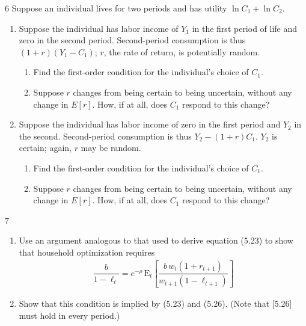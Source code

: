 \begin{problem}{6}
Suppose an individual lives for two periods and has utility \(\ln C_1+\ln C_2\).
\begin{enumerate}[label=(\alph*)]
    \item Suppose the individual has labor income of \(Y_1\) in the first period of life and zero in the second period. Second-period consumption is thus \(\left(1+r\right)\left(Y_1-C_1\right)\); \(r\), the rate of return, is potentially random.
    \begin{enumerate}[label=(\roman*)]
        \item Find the first-order condition for the individual's choice of \(C_1\).
        \item Suppose \(r\) changes from being certain to being uncertain, without any change in \(E\left[r\right]\). How, if at all, does \(C_1\) respond to this change?
    \end{enumerate}
    \item Suppose the individual has labor income of zero in the first period and \(Y_2\) in the second. Second-period consumption is thus \(Y_2-\left(1+r\right)C_1\). \(Y_2\) is certain; again, \(r\) may be random.
    \begin{enumerate}[label=(\roman*)]
        \item Find the first-order condition for the individual's choice of \(C_1\).
        \item Suppose \(r\) changes from being certain to being uncertain, without any change in \(E\left[r\right]\). How, if at all, does \(C_1\) respond to this change?
    \end{enumerate}
\end{enumerate}
\end{problem}

\begin{problem}{7}
\begin{enumerate}[label=(\alph*)]
    \item Use an argument analogous to that used to derive equation (5.23) to show that household optimization requires 
    \begin{align*}
        \dfrac{b}{1-\ell_t} = e^{-\rho}\,\text{E}_t\left[\dfrac{b\,w_t\left(1+r_{t+1}\right)}{w_{t+1}\left(1-\ell_{t+1}\right)}\right]
    \end{align*}
    \item Show that this condition is implied by (5.23) and (5.26). (Note that [5.26] must hold in every period.)
\end{enumerate}
\end{problem}


